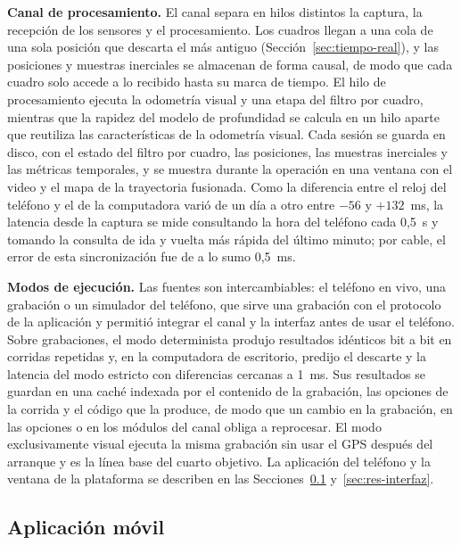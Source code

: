 \textbf{Canal de procesamiento.}
El canal separa en hilos distintos la captura, la recepción de los sensores y el procesamiento.
Los cuadros llegan a una cola de una sola posición que descarta el más antiguo (Sección~\ref{sec:tiempo-real}), y las posiciones y muestras inerciales se almacenan de forma causal, de modo que cada cuadro solo accede a lo recibido hasta su marca de tiempo.
El hilo de procesamiento ejecuta la odometría visual y una etapa del filtro por cuadro, mientras que la rapidez del modelo de profundidad se calcula en un hilo aparte que reutiliza las características de la odometría visual.
Cada sesión se guarda en disco, con el estado del filtro por cuadro, las posiciones, las muestras inerciales y las métricas temporales, y se muestra durante la operación en una ventana con el video y el mapa de la trayectoria fusionada.
Como la diferencia entre el reloj del teléfono y el de la computadora varió de un día a otro entre $-56$ y $+132$~ms, la latencia desde la captura se mide consultando la hora del teléfono cada 0,5~s y tomando la consulta de ida y vuelta más rápida del último minuto; por cable, el error de esta sincronización fue de a lo sumo 0,5~ms.

\textbf{Modos de ejecución.}
Las fuentes son intercambiables: el teléfono en vivo, una grabación o un simulador del teléfono, que sirve una grabación con el protocolo de la aplicación y permitió integrar el canal y la interfaz antes de usar el teléfono.
Sobre grabaciones, el modo determinista produjo resultados idénticos bit a bit en corridas repetidas y, en la computadora de escritorio, predijo el descarte y la latencia del modo estricto con diferencias cercanas a 1~ms.
Sus resultados se guardan en una caché indexada por el contenido de la grabación, las opciones de la corrida y el código que la produce, de modo que un cambio en la grabación, en las opciones o en los módulos del canal obliga a reprocesar.
El modo exclusivamente visual ejecuta la misma grabación sin usar el GPS después del arranque y es la línea base del cuarto objetivo.
La aplicación del teléfono y la ventana de la plataforma se describen en las Secciones~\ref{sec:res-app} y~\ref{sec:res-interfaz}.

\subsection{Aplicación móvil}
\label{sec:res-app}

